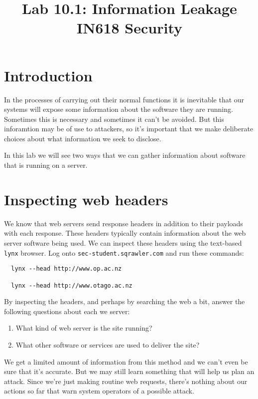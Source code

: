 \documentclass{article}
\begin{document}
\title{ Lab 10.1: Information Leakage \\ IN618 Security}
\maketitle

\section*{Introduction}
In the processes of carrying out their normal functions it is inevitable that our systems will  expose
some information about the software they are running. Sometimes this is necessary and sometimes it can't
be avoided. But this inforamtion may be of use to attackers, so it's important that we make deliberate
choices about what information we seek to disclose.

In this lab we will see two ways that we can gather information about software that is running on a
server.

\section{Inspecting web headers}
We know that web servers send response headers in addition to their payloads with each response. These
headers typically contain information about the web server software being used.  We can inspect 
these headers using the text-based \texttt{lynx} browser.  Log onto \texttt{sec-student.sqrawler.com}
and run these commands:

\begin{verbatim}
  lynx --head http://www.op.ac.nz

  lynx --head http://www.otago.ac.nz
\end{verbatim}

By inspecting the headers, and perhaps by searching the web a bit, answer the following questions 
about each we server:

\begin{enumerate}
	\item What kind of web server is the site running?
	\item What other software or services are used to deliver the site?
\end{enumerate}

\vspace{500mm}

We get a limited amount of information from this method and we can't even be sure that it's accurate.
But we may still learn something that will help us plan an attack.  Since we're just making routine
web requests, there's nothing about our actions so far that warn system operators of a possible attack.
\end{document}
